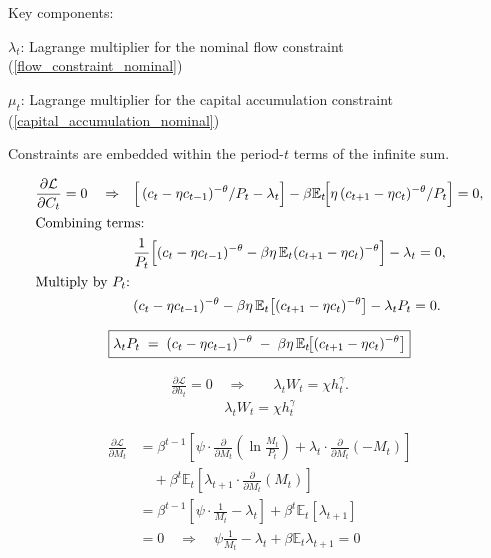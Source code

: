\documentclass[11pt,preprint]{elsarticle}
\numberwithin{equation}{section}
\numberwithin{figure}{section}
\numberwithin{table}{section}
\begin{document}
Key components:

\(\lambda_t\): Lagrange multiplier for the nominal flow constraint
(\ref{flow_constraint_nominal})

\(\mu_t\): Lagrange multiplier for the capital accumulation constraint
(\ref{capital_accumulation_nominal})

Constraints are embedded within the period-\(t\) terms of the infinite
sum.

\begin{align*}
  \frac{\partial \mathcal{L}}{\partial C_t} = 0
  \quad\Rightarrow\quad
  &\Bigl[\,(c_t - \eta c_{t-1})^{-\theta}/P_t - \lambda_t\Bigr]
    - \beta \mathbb{E}_t\!\Bigl[\eta\,(c_{t+1}-\eta c_t)^{-\theta}/P_t\Bigr]
    = 0,\\
  \intertext{Combining terms:}
  &\frac{1}{P_t}\Bigl[
     (c_t - \eta c_{t-1})^{-\theta}
     - \beta \eta\,\mathbb{E}_t (c_{t+1} - \eta c_t)^{-\theta}
   \Bigr]
   - \lambda_t
   = 0,\\
  \intertext{Multiply by \(P_t\):}
  &(c_t - \eta c_{t-1})^{-\theta}
   - \beta \eta\,\mathbb{E}_t\bigl[(c_{t+1} - \eta c_t)^{-\theta}\bigr]
   - \lambda_t P_t
   = 0.
\end{align*}

\begin{equation}\label{foc_C}
  \boxed{%
    \lambda_t P_t
    \;=\;
    (c_t - \eta c_{t-1})^{-\theta}
    \;-\;
    \beta \eta\,\mathbb{E}_t\!\bigl[(c_{t+1} - \eta c_t)^{-\theta}\bigr]
  }
\end{equation}

\begin{align*}
  \frac{\partial \mathcal{L}}{\partial h_t} = 0
  \quad\Rightarrow\quad
  &\lambda_t W_t = \chi h_t^{\gamma}.
\end{align*} \begin{equation}\label{foc_h}
  \boxed{\lambda_t W_t = \chi h_t^{\gamma}}
\end{equation}

\begin{align*}
\frac{\partial \mathcal{L}}{\partial M_t} 
&= \beta^{t-1} \left[ 
   \psi \cdot \frac{\partial}{\partial M_t} \left( \ln \frac{M_t}{P_t} \right) 
   + \lambda_t \cdot \frac{\partial}{\partial M_t} (-M_t) 
\right] \\
&\quad + \beta^{t} \mathbb{E}_t \left[ 
   \lambda_{t+1} \cdot \frac{\partial}{\partial M_t} (M_t)
\right] \\
&= \beta^{t-1} \left[ 
   \psi \cdot \frac{1}{M_t} 
   - \lambda_t 
\right] 
+ \beta^{t} \mathbb{E}_t \left[ \lambda_{t+1} \right] \\
&= 0 \quad\Rightarrow\quad
\psi \frac{1}{M_t} - \lambda_t + \beta \mathbb{E}_t \lambda_{t+1} = 0
\end{align*}
\end{document}
